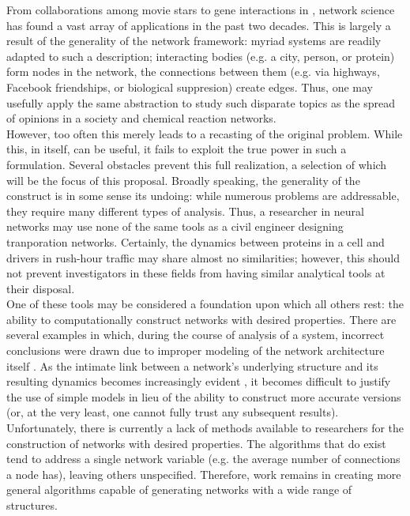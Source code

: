 \documentclass[11pt]{article}
\begin{document}
From collaborations among movie stars \cite{Barabasi1999} to gene interactions in  \cite{Dreze2009}, network science has found a vast array of applications in the past two decades. This is largely a result of the generality of the network framework: myriad systems are readily adapted to such a description; interacting bodies (e.g. a city, person, or protein) form nodes in the network, the connections between them (e.g. via highways, Facebook friendships, or biological suppresion) create edges. Thus, one may usefully apply the same abstraction to study such disparate topics as the spread of opinions in a society and chemical reaction networks. \vspace{1mm}\\
However, too often this merely leads to a recasting of the original problem. While this, in itself, can be useful, it fails to exploit the true power in such a formulation. Several obstacles prevent this full realization, a selection of which will be the focus of this proposal. Broadly speaking, the generality of the construct is in some sense its undoing: while numerous problems are addressable, they require many different types of analysis. Thus, a researcher in neural networks may use none of the same tools as a civil engineer designing tranporation networks. Certainly, the dynamics between proteins in a cell and drivers in rush-hour traffic may share almost no similarities; however, this should not prevent investigators in these fields from having similar analytical tools at their disposal.\vspace{1mm}\\ %
One of these tools may be considered a foundation upon which all others rest: the ability to computationally construct networks with desired properties. There are several examples in which, during the course of analysis of a system, incorrect conclusions were drawn due to improper modeling of the network architecture itself \cite{theinternetisscalefree,smallworld,etc.} \cite{Watts1998}. As the intimate link between a network's underlying structure and its resulting dynamics becomes increasingly evident \cite{Barabasi1999} \cite{Barzel2013}, it becomes difficult to justify the use of simple models in lieu of the ability to construct more accurate versions (or, at the very least, one cannot fully trust any subsequent results). Unfortunately, there is currently a lack of methods available to researchers for the construction of networks with desired properties. The algorithms that do exist tend to address a single network variable (e.g. the average number of connections a node has), leaving others unspecified. Therefore, work remains in creating more general algorithms capable of generating networks with a wide range of structures.\vspace{1mm}\\
\end{document}
